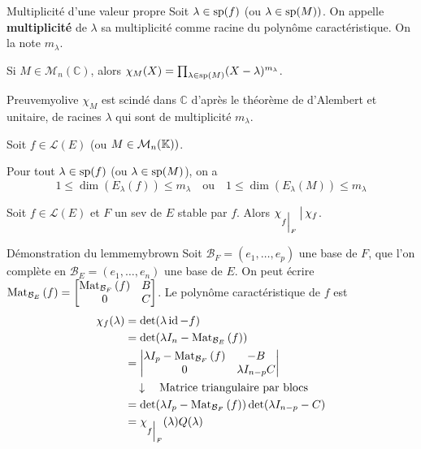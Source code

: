     \begin{defi}{Multiplicité d’une valeur propre}{}
        Soit $\lambda \in \sp(f)$ (ou $\lambda \in \sp(M))$. On appelle \textbf{multiplicité} de $\lambda$ sa multiplicité comme racine du polynôme caractéristique. On la note $m_{\lambda}$.
    \end{defi}

    \begin{prop}{}{}
        Si $M \in \mathcal{M}_n(\mathbb{C})$, alors $\chi_M(X) = \prod_{\lambda \in \sp(M)} (X - \lambda)^{m_{\lambda}}$.
    \end{prop}

    \begin{demo}{Preuve}{myolive}
        $\chi_M$ est scindé dans $\mathbb{C}$ d’après le théorème de d’Alembert et unitaire, de racines $\lambda$ qui sont de multiplicité $m_{\lambda}$.
    \end{demo}

    \begin{prop}{}{}
        Soit $f \in \mathcal{L}(E)$ (ou $M \in \mk{n})$.

        Pour tout $\lambda \in \sp(f)$ (ou $\lambda \in \sp(M)$), on a 
        \[ 1 \leq \dim(E_{\lambda}(f)) \leq m_{\lambda} \quad \text{ou} \quad 1 \leq \dim(E_{\lambda}(M)) \leq m_{\lambda} \]
    \end{prop}

    \begin{lem}{}{}
        Soit $f \in \mathcal{L}(E)$ et $F$ un sev de $E$ stable par $f$. Alors $\chi_{\restr{f}{F}} \vbar \chi_{f}$.
    \end{lem}
    
    \begin{demo}{Démonstration du lemme}{mybrown}
        Soit $\mathcal{B}_F = (e_1,\ldots,e_p)$ une base de $F$, que l’on complète en $\mathcal{B}_E = (e_1,\ldots, e_n)$ une base de $E$. On peut écrire $\mat{\mathcal{B}_E}{f} = \begin{bmatrix}
            \mat{\mathcal{B}_F}{f} & B \\
            0 & C
        \end{bmatrix}$. Le polynôme caractéristique de $f$ est 
        \begin{align*}
            \chi_f(\lambda)
            &= \det(\lambda \id - f) \\
            &= \det(\lambda I_n - \mat{\mathcal{B}_E}{f}) \\
            &= \begin{vmatrix}
                \lambda I_p - \mat{\mathcal{B}_F}{f} & - B \\
                0 & \lambda I_{n-p} C 
            \end{vmatrix} \\
            &\quad \downarrow \quad \text{Matrice triangulaire par blocs} \\
            &= \det(\lambda I_p - \mat{\mathcal{B}_F}{f}) \det(\lambda I_{n-p} - C) \\
            &= \chi_{\restr{f}{F}}(\lambda) Q(\lambda)
        \end{align*}
    \end{demo}

